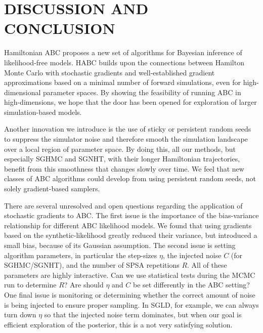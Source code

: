 \documentclass[]{article}
\begin{document}

\section{DISCUSSION AND CONCLUSION} \label{sec:conclusion}
Hamiltonian ABC proposes a new set of algorithms for Bayesian inference of likelihood-free models.  HABC builds  upon the connections between Hamilton Monte Carlo with stochastic gradients and well-established gradient approximations based on a minimal number of forward simulations, even for high-dimensional parameter spaces.  By showing the feasibility of running ABC in high-dimensions, we hope that the door has been opened for exploration of larger simulation-based models. 

Another innovation we introduce is the use of sticky or persistent random seeds to suppress the simulator noise and therefore smooth the simulation landscape over a local region of parameter space.  By doing this, all our methods, but especially SGHMC and SGNHT, with their longer Hamiltonian trajectories, benefit from this smoothness that changes slowly over time.  We feel that new classes of ABC algorithms could develop from using persistent random seeds, not solely gradient-based samplers.
 
There are several unresolved and open questions regarding the application of stochastic gradients to ABC.  The first issue is the importance of the bias-variance relationship for different ABC likelihood models.    We found that using gradients based on the synthetic-likelihood greatly reduced their variance, but introduced a small bias, because of its Gaussian assumption.  The second issue is setting algorithm parameters, in particular the step-sizes $\eta$, the injected noise $C$ (for SGHMC/SGNHT), and the number of SPSA repetitions $R$.  All of these parameters are highly interactive.  Can we use statistical tests during the MCMC run to determine $R$?  Are should $\eta$ and $C$ be set differently in the ABC setting?  One final issue is monitoring or determining whether the correct amount of noise is being injected to ensure proper sampling.  In SGLD, for example, we can always turn down $\eta$ so that the injected noise term dominates, but when our goal is efficient exploration of the posterior, this is a not very satisfying solution.
\end{document}
